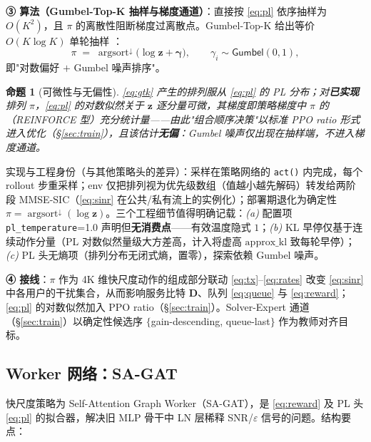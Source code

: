 \documentclass[UTF8,11pt,a4paper]{ctexart}
\theoremstyle{plain}
\newtheorem{proposition}[theorem]{命题}
\theoremstyle{definition}
\theoremstyle{remark}
\newcommand{\vect}[1]{\mathbf{#1}}
\begin{document}
\textbf{③ 算法（Gumbel-Top-K 抽样与梯度通道）}：直接按 \eqref{eq:pl} 依序抽样为 $O(K^2)$，且 $\pi$ 的离散性阻断梯度过离散点。Gumbel-Top-K 给出等价 $O(K\log K)$ 单轮抽样 \cite{kool2019stochastic}：
\begin{equation}
  \pi \;=\; \operatorname{argsort}^{\downarrow}\!\big(\log\vect z + \vect\gamma\big),\qquad
  \gamma_i \sim \mathsf{Gumbel}(0,1),
  \label{eq:gtk}
\end{equation}
即"对数偏好 $+$ Gumbel 噪声排序"。

\begin{proposition}[可微性与无偏性] \label{prop:pl}
\eqref{eq:gtk} 产生的排列服从 \eqref{eq:pl} 的 PL 分布；对\textbf{已实现}排列 $\pi$，\eqref{eq:pl} 的对数似然关于 $\vect z$ 逐分量可微，其梯度即策略梯度中 $\pi$ 的（REINFORCE 型）充分统计量——由此"组合顺序决策"以标准 PPO ratio 形式进入优化（\S\ref{sec:train}），且该估计\textbf{无偏}：Gumbel 噪声仅出现在抽样端，不进入梯度通道。
\end{proposition}

实现与工程身份（与其他策略头的差异）：采样在策略网络的 \texttt{act()} 内完成，每个 rollout 步重采样；env 仅把排列视为优先级数组（值越小越先解码）转发给两阶段 MMSE-SIC（\eqref{eq:sinr} 在公共/私有流上的实例化）；部署期退化为确定性 $\pi=\operatorname{argsort}^{\downarrow}(\log\vect z)$。三个工程细节值得明确记载：\emph{(a)} 配置项 \texttt{pl\_temperature}=1.0 声明但\textbf{无消费点}——有效温度隐式 $1$；\emph{(b)} KL 早停仅基于连续动作分量（PL 对数似然量级大方差高，计入将虚高 $\mathrm{approx\_kl}$ 致每轮早停）；\emph{(c)} PL 头无熵项（排列分布无闭式熵，置零），探索依赖 Gumbel 噪声。

\textbf{④ 接线}：$\pi$ 作为 4K 维快尺度动作的组成部分联动 \eqref{eq:tx}--\eqref{eq:rates} 改变 \eqref{eq:sinr} 中各用户的干扰集合，从而影响服务比特 $\vect D$、队列 \eqref{eq:queue} 与 \eqref{eq:reward}；\eqref{eq:pl} 的对数似然加入 PPO ratio（\S\ref{sec:train}）。Solver-Expert 通道（\S\ref{sec:train}）以确定性候选序 $\{$gain-descending, queue-last$\}$ 作为教师对齐目标。

\subsection{Worker 网络：SA-GAT} \label{sec:worker}

快尺度策略为 Self-Attention Graph Worker（SA-GAT），是 \eqref{eq:reward} 及 PL 头 \eqref{eq:pl} 的拟合器，解决旧 MLP 骨干中 LN 层稀释 SNR/$\varepsilon$ 信号的问题。结构要点：
\end{document}
